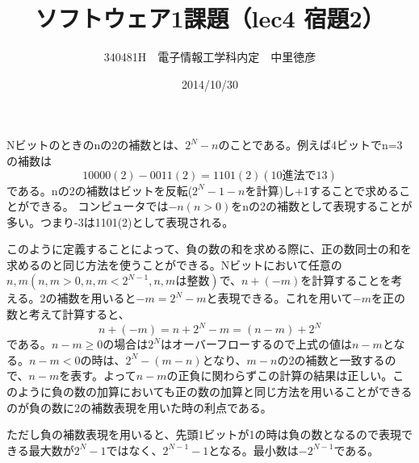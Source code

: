\documentclass{jsarticle}
\title{ソフトウェア1課題（lec4 宿題2）}
\author{340481H　電子情報工学科内定　中里徳彦}
\date{2014/10/30}
\begin{document}
\maketitle
Nビットのときのnの2の補数とは、$2^N - n$のことである。例えば4ビットでn=3の補数は
\[
10000(2) - 0011(2) = 1101(2) (10進法で13)
\]
である。nの2の補数はビットを反転($2^{N}-1-n$を計算)し+1することで求めることができる。
コンピュータでは$-n(n>0)$をnの2の補数として表現することが多い。つまり-3は1101(2)として表現される。

このように定義することによって、負の数の和を求める際に、正の数同士の和を求めるのと同じ方法を使うことができる。Nビットにおいて任意の$n,m(n,m > 0, n,m < 2^{N-1}, n,mは整数)$で、$n+(-m)$を計算することを考える。2の補数を用いると$-m = 2^N - m$と表現できる。これを用いて$-m$を正の数と考えて計算すると、
\[
n+(-m) = n + 2^N -m = (n-m) + 2^N
\]
である。$n-m \ge 0$の場合は$2^N$はオーバーフローするので上式の値は$n-m$となる。$n-m < 0$の時は、$2^N - (m-n)$となり、$m-n$の2の補数と一致するので、$n-m$を表す。よって$n-m$の正負に関わらずこの計算の結果は正しい。このように負の数の加算においても正の数の加算と同じ方法を用いることができるのが負の数に2の補数表現を用いた時の利点である。

ただし負の補数表現を用いると、先頭1ビットが1の時は負の数となるので表現できる最大数が$2^{N}-1$ではなく、$2^{N-1}-1$となる。最小数は$-2^{N-1}$である。
\end{document}
